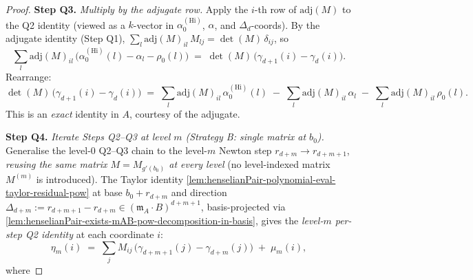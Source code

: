 \begin{proof}
\textbf{Step Q3.} \emph{Multiply by the adjugate row.}
Apply the $i$-th row of $\mathrm{adj}(M)$ to the Q2 identity
(viewed as a $k$-vector in $\alpha^{(\mathrm{Hi})}_0$, $\alpha$,
and $\Delta_d$-coords). By the adjugate identity (Step Q1),
$\sum_l \mathrm{adj}(M)_{il}\,M_{lj} = \det(M)\,\delta_{ij}$, so
\[
\sum_l \mathrm{adj}(M)_{il}\,\bigl(\alpha^{(\mathrm{Hi})}_0(l)
- \alpha_l - \rho_0(l)\bigr)
\;=\;
\det(M)\,\bigl(\gamma_{d+1}(i) - \gamma_d(i)\bigr).
\]
Rearrange:
\[
\det(M)\,\bigl(\gamma_{d+1}(i) - \gamma_d(i)\bigr)
\;=\;
\sum_l \mathrm{adj}(M)_{il}\,\alpha^{(\mathrm{Hi})}_0(l)
\;-\; \sum_l \mathrm{adj}(M)_{il}\,\alpha_l
\;-\; \sum_l \mathrm{adj}(M)_{il}\,\rho_0(l).
\]
This is an \emph{exact} identity in $A$, courtesy of the adjugate.

\textbf{Step Q4.} \emph{Iterate Steps Q2--Q3 at level $m$
(Strategy B: single matrix at $b_0$).}
Generalise the level-$0$ Q2--Q3 chain to the level-$m$ Newton
step $r_{d+m} \to r_{d+m+1}$, \emph{reusing the same matrix
$M = M_{g'(b_0)}$ at every level} (no level-indexed matrix
$M^{(m)}$ is introduced). The Taylor identity
\cref{lem:henselianPair-polynomial-eval-taylor-residual-pow} at
base $b_0 + r_{d+m}$ and direction
$\Delta_{d+m} := r_{d+m+1} - r_{d+m} \in (\mathfrak m_A \cdot
B)^{d+m+1}$, basis-projected via
\cref{lem:henselianPair-exists-mAB-pow-decomposition-in-basis},
gives the \emph{level-$m$ per-step Q2 identity} at each
coordinate $i$:
\[
\eta_m(i)
\;=\;
\sum_j M_{ij}\,\bigl(\gamma_{d+m+1}(j) - \gamma_{d+m}(j)\bigr)
\;+\; \mu_m(i),
\]
where
\end{proof}
